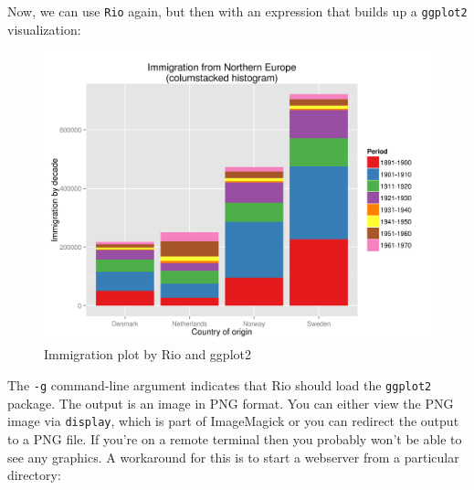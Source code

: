 \documentclass[
]{book}
\newenvironment{Shaded}{\begin{snugshade}}{\end{snugshade}}
\newcommand{\ExtensionTok}[1]{#1}
\newcommand{\KeywordTok}[1]{\textcolor[rgb]{0.13,0.29,0.53}{\textbf{#1}}}
\newcommand{\NormalTok}[1]{#1}
\newcommand{\OperatorTok}[1]{\textcolor[rgb]{0.81,0.36,0.00}{\textbf{#1}}}
\newcommand{\StringTok}[1]{\textcolor[rgb]{0.31,0.60,0.02}{#1}}
\theoremstyle{definition}
\theoremstyle{definition}
\theoremstyle{definition}
\theoremstyle{remark}
\begin{document}
Now, we can use \texttt{Rio} again, but then with an expression that builds up a \texttt{ggplot2} visualization:

\begin{Shaded}
\end{Shaded}

\begin{figure}

{\centering \includegraphics[width=32.81in]{images/rio-immigration} 

}

\caption{Immigration plot by Rio and ggplot2}\label{fig:unnamed-chunk-19}
\end{figure}

The \texttt{-g} command-line argument indicates that Rio should load the \texttt{ggplot2} package. The output is an image in PNG format. You can either view the PNG image via \texttt{display}, which is part of ImageMagick \citep{display} or you can redirect the output to a PNG file. If you're on a remote terminal then you probably won't be able to see any graphics. A workaround for this is to start a webserver from a particular directory:
\end{document}
